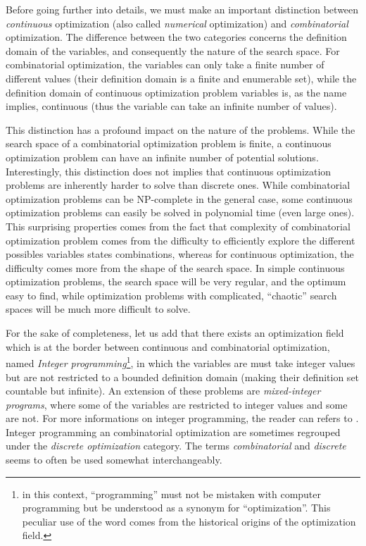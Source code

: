 Before going further into details, we must make an important distinction between \emph{continuous} optimization (also called \emph{numerical} optimization) and \emph{combinatorial} optimization. The difference between the two categories concerns the definition domain of the variables, and consequently the nature of the search space. For combinatorial optimization, the variables can only take a finite number of different values (their definition domain is a finite and enumerable set), while the definition domain of continuous optimization problem variables is, as the name implies, continuous (thus the variable can take an infinite number of values).

This distinction has a profound impact on the nature of the problems. While the search space of a combinatorial optimization problem is finite, a continuous optimization problem can have an infinite number of potential solutions. Interestingly, this distinction does not implies that continuous optimization problems are inherently harder to solve than discrete ones. While combinatorial optimization problems can be NP-complete in the general case, some continuous optimization problems can easily be solved in polynomial time (even large ones). This surprising properties comes from the fact that complexity of combinatorial optimization problem comes from the difficulty to efficiently explore the different possibles variables states combinations, whereas for continuous optimization, the difficulty comes more from the shape of the search space. In simple continuous optimization problems, the search space will be very regular, and the optimum easy to find, while optimization problems with complicated, \enquote{chaotic} search spaces will be much more difficult to solve.

For the sake of completeness, let us add that there exists an optimization field which is at the border between continuous and combinatorial optimization, named \emph{Integer programming}\footnote{in this context, \enquote{programming} must not be mistaken with computer programming but be understood as a synonym for \enquote{optimization}. This peculiar use of the word comes from the historical origins of the optimization field.}, in which the variables are must take integer values but are not restricted to a bounded definition domain (making their definition set countable but infinite). An extension of these problems are \emph{mixed-integer programs}, where some of the variables are restricted to integer values and some are not. For more informations on integer programming, the reader can refers to \cite{schrijver1998theory}. Integer programming an combinatorial optimization are sometimes regrouped under the \emph{discrete optimization} category. The terms \emph{combinatorial} and \emph{discrete} seems to often be used somewhat interchangeably.

